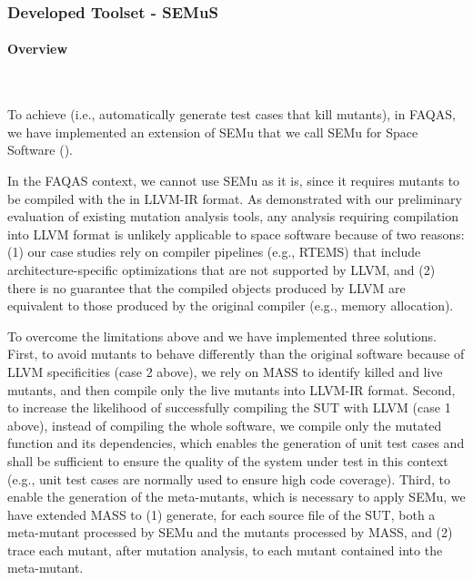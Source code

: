 
\newpage
\subsubsection{Developed Toolset - SEMuS}
\label{sec:semus}

\STARTCHANGEDFINAL
\paragraph{Overview}\





To achieve  (i.e., automatically generate test cases that kill mutants), in FAQAS, we have implemented an extension of SEMu that we call SEMu for Space Software ().



In the FAQAS context, we cannot use SEMu as it is, since it requires mutants to be compiled with the  in LLVM-IR format. As demonstrated with our preliminary evaluation of existing mutation analysis tools, any analysis requiring compilation into LLVM format is unlikely applicable to space software because of two reasons:  (1) our case studies rely on compiler pipelines (e.g., RTEMS) that include architecture-specific optimizations that are not supported by LLVM, and (2) there is no guarantee that the compiled objects produced by LLVM are equivalent to those produced by the original compiler (e.g., memory allocation).

To overcome the limitations above and  we have implemented three solutions.
First, to avoid mutants to behave differently than the original software because of LLVM specificities (case 2 above), we rely on  MASS to identify killed and live mutants, and then compile only the live mutants into LLVM-IR format.
Second, to increase the likelihood of successfully compiling the SUT with LLVM (case 1 above),  instead of compiling the whole software, we compile only the mutated function and its dependencies, which enables the generation of unit test cases and shall be sufficient to ensure the quality of the system under test in this context (e.g., unit test cases are normally used to ensure high code coverage). Third, to enable the generation of the meta-mutants, which is necessary to apply SEMu, we have extended MASS to (1) generate, for each source file of the SUT, both a meta-mutant processed by SEMu and the mutants processed by MASS, and (2) trace each mutant, after mutation analysis, to each mutant contained into the meta-mutant.





